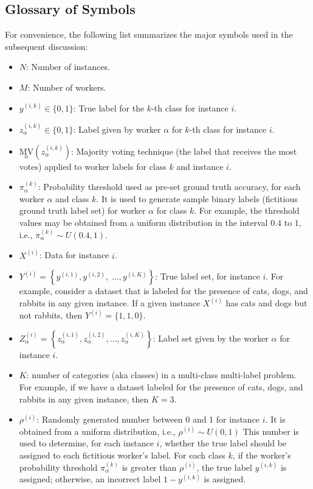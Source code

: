 \subsection{Glossary of Symbols}
For convenience, the following list summarizes the major symbols used in the subsequent discussion:
\begin{itemize}
\renewcommand{\textbullet}{}
    \item  $N$: Number of instances.
    \item  $M$: Number of workers.
    \item  $y^{(i,k)} \in \{0,1\} $: True label for the $k $-th class for instance $i $.
    \item  $z_\alpha^{(i,k)} \in \{0,1\} $: Label given by worker $\alpha $ for $k $-th class for instance $i $.
    \item  ${{\underset\alpha{\mathrm{MV}}}{\left(z_\alpha^{(i,k)}\right)}} $: Majority voting technique (the label that receives the most votes) applied to worker labels for class $k $ and instance $i $.
    \item  $\pi_\alpha^{(k)} $: Probability threshold used as pre-set ground truth accuracy, for each worker $\alpha$ and class $k$. It is used to generate sample binary labels (fictitious ground truth label set) for worker $\alpha $ for class $k $. For example, the threshold values may be obtained from a uniform distribution in the interval $0.4 $ to $1 $, i.e., $\pi_\alpha^{(k)} \sim U(0.4,1) $.
    \item  $X^{(i)} $: Data for instance $i$.
    \item  $Y^{(i)}=\left\{y^{(i,1)},y^{(i,2)},\;\dots,y^{(i,K)}\right\} $: True label set, for instance $i $. For example, consider a dataset that is labeled for the presence of cats, dogs, and rabbits in any given instance. If a given instance $X^{(i)} $ has cats and dogs but not rabbits, then $Y^{(i)}=\{1,1,0\} $.
    \item  $Z_{\alpha}^{(i)}=\left\{z_\alpha^{(i,1)}, z_\alpha^{(i,2)}, \dots, z_\alpha^{(i,K)}\right\} $: Label set given by the worker $\alpha $ for instance $i $.
    \item $K$: number of categories (aka classes) in a multi-class multi-label problem. For example, if we have a dataset labeled for the presence of cats, dogs, and rabbits in any given instance, then $K=3$.
    \item  $\rho^{(i)}$: Randomly generated number  between 0 and 1 for instance $i $. It is obtained from a uniform distribution, i.e., $\rho^{(i)} \sim U(0,1) $ This number is used to determine, for each instance $i$, whether the true label should be assigned to each fictitious worker's label. For each class $k$, if the worker's probability threshold $\pi_\alpha^{(k)}$ is greater than $\rho^{(i)}$, the true label $y^{(i,k)}$ is assigned; otherwise, an incorrect label $1 - y^{(i,k)}$  is assigned.

\end{itemize}
